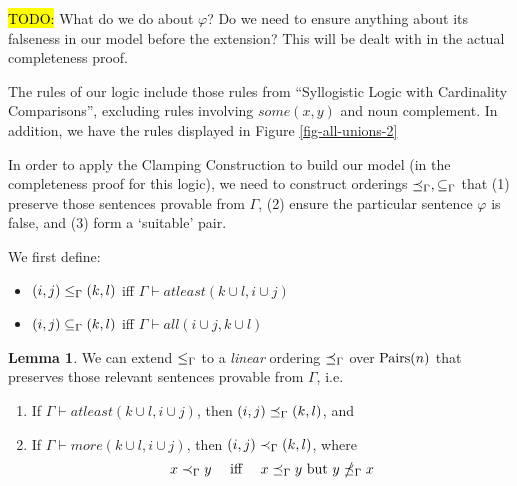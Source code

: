 \documentclass[12pt]{article}
\theoremstyle{definition}
\newtheorem{lemma}[theorem]{Lemma}
\newcommand{\quadiff}{\quad \mbox{ iff } \quad}
\begin{document}
\newcommand{\proverule}{\textsc}


\newcommand{\code}[1]{\colorbox{light-gray}{\texttt{#1}}}


\hl{TODO:} What do we do about $\varphi$?  Do we need to ensure anything about its falseness in our model before the extension?  This will be dealt with in the actual completeness proof.

The rules of our logic include those rules from ``Syllogistic Logic with Cardinality Comparisons'', excluding rules involving $some(x, y)$ and noun complement.  In addition, we have the rules displayed in Figure \ref{fig-all-unions-2}

In order to apply the Clamping Construction to build our model (in the completeness proof for this logic), we need to construct orderings $\preceq_{\Gamma}, \subseteq_{\Gamma}$ that (1) preserve those sentences provable from $\Gamma$, (2) ensure the particular sentence $\varphi$ is false, and (3) form a `suitable' pair.

We first define:

\begin{itemize}
    \item $(i, j) \le_{\Gamma} (k, l)$ iff $\Gamma \vdash atleast(k \cup l, i \cup j)$
    
    \item $(i, j) \subseteq_{\Gamma} (k, l)$ iff $\Gamma \vdash all(i \cup j, k \cup l)$
\end{itemize}

\begin{lemma}
    We can extend $\le_{\Gamma}$ to a \textit{linear} ordering $\preceq_{\Gamma}$ over $\mbox{Pairs}(n)$ that preserves those relevant sentences provable from $\Gamma$, i.e.
    
    \begin{enumerate}
        \item If $\Gamma \vdash atleast(k \cup l, i \cup j)$, then $(i,j) \preceq_{\Gamma} (k,l)$, and
        
        \item If $\Gamma \vdash more(k \cup l, i \cup j)$, then $(i,j) \prec_{\Gamma} (k,l)$, where
        \[ x \provextendedstrict y \quadiff x \provextended y \mbox{ but } y \nprovextended x\]
    \end{enumerate}
\end{lemma}
\end{document}
